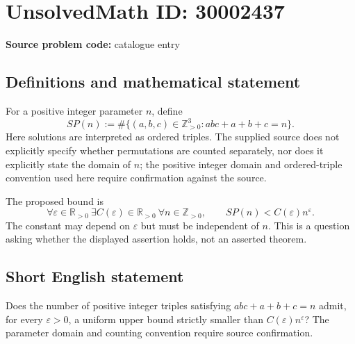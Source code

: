 \documentclass[11pt]{article}
\newcommand{\Z}{\mathbb{Z}}
\newcommand{\R}{\mathbb{R}}
\begin{document}
\section*{UnsolvedMath ID: 30002437}
\textbf{Source problem code:} catalogue entry
\subsection{Definitions and mathematical statement}
For a positive integer parameter \(n\), define
\[
SP(n):=\#\bigl\{(a,b,c)\in\Z_{>0}^{3}:abc+a+b+c=n\bigr\}.
\]
Here solutions are interpreted as ordered triples. The supplied source does not explicitly specify whether permutations are counted separately, nor does it explicitly state the domain of \(n\); the positive integer domain and ordered-triple convention used here require confirmation against the source.

The proposed bound is
\[
\forall\varepsilon\in\R_{>0}\ \exists C(\varepsilon)\in\R_{>0}\ \forall n\in\Z_{>0},\qquad
SP(n)<C(\varepsilon)n^{\varepsilon}.
\]
The constant may depend on \(\varepsilon\) but must be independent of \(n\). This is a question asking whether the displayed assertion holds, not an asserted theorem.
\subsection{Short English statement}
Does the number of positive integer triples satisfying \(abc+a+b+c=n\) admit, for every \(\varepsilon>0\), a uniform upper bound strictly smaller than \(C(\varepsilon)n^{\varepsilon}\)? The parameter domain and counting convention require source confirmation.
\end{document}
